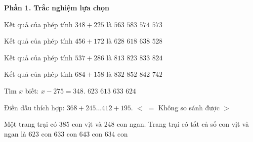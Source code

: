 \textbf{Phần 1. Trắc nghiệm lựa chọn}

\begin{ex} %
Kết quả của phép tính $348 + 225$ là
\choice
{$563$}
{$583$}
{$574$}
{\True $573$}
\end{ex}

\begin{ex} %
Kết quả của phép tính $456 + 172$ là
\choice
{\True $628$}
{$618$}
{$638$}
{$528$}
\end{ex}

\begin{ex} %
Kết quả của phép tính $537 + 286$ là
\choice
{$813$}
{\True $823$}
{$833$}
{$824$}
\end{ex}

\begin{ex} %
Kết quả của phép tính $684 + 158$ là
\choice
{$832$}
{$852$}
{\True $842$}
{$742$}
\end{ex}

\begin{ex} %
Tìm $x$ biết: $x - 275 = 348$.
\choice
{\True $623$}
{$613$}
{$633$}
{$624$}
\end{ex}

\begin{ex} %
Điền dấu thích hợp: $368 + 245 \dots 412 + 195$.
\choice
{$<$}
{$=$}
{Không so sánh được}
{\True $>$}
\end{ex}

\begin{ex} %
Một trang trại có 385 con vịt và 248 con ngan. Trang trại có tất cả số con vịt và ngan là
\choice
{$623$ con}
{\True $633$ con}
{$643$ con}
{$634$ con}
\end{ex}

